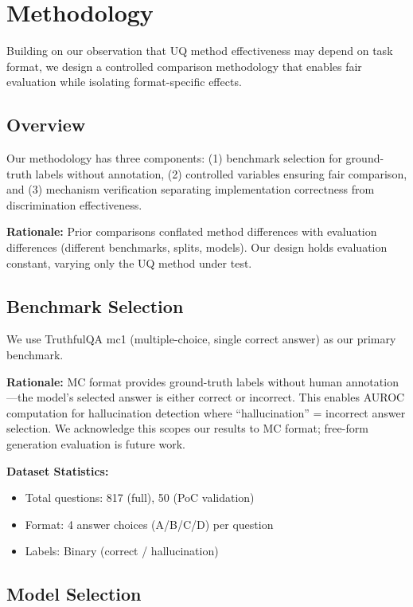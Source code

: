 \section{Methodology}
\label{sec:methodology}

Building on our observation that UQ method effectiveness may depend on task format, we design a controlled comparison methodology that enables fair evaluation while isolating format-specific effects.

\subsection{Overview}

Our methodology has three components: (1) benchmark selection for ground-truth labels without annotation, (2) controlled variables ensuring fair comparison, and (3) mechanism verification separating implementation correctness from discrimination effectiveness.

\textbf{Rationale:} Prior comparisons conflated method differences with evaluation differences (different benchmarks, splits, models). Our design holds evaluation constant, varying only the UQ method under test.

\subsection{Benchmark Selection}

We use TruthfulQA mc1 (multiple-choice, single correct answer) as our primary benchmark.

\textbf{Rationale:} MC format provides ground-truth labels without human annotation---the model's selected answer is either correct or incorrect. This enables AUROC computation for hallucination detection where ``hallucination'' = incorrect answer selection. We acknowledge this scopes our results to MC format; free-form generation evaluation is future work.

\textbf{Dataset Statistics:}
\begin{itemize}
    \item Total questions: 817 (full), 50 (PoC validation)
    \item Format: 4 answer choices (A/B/C/D) per question
    \item Labels: Binary (correct / hallucination)
\end{itemize}

\subsection{Model Selection}

